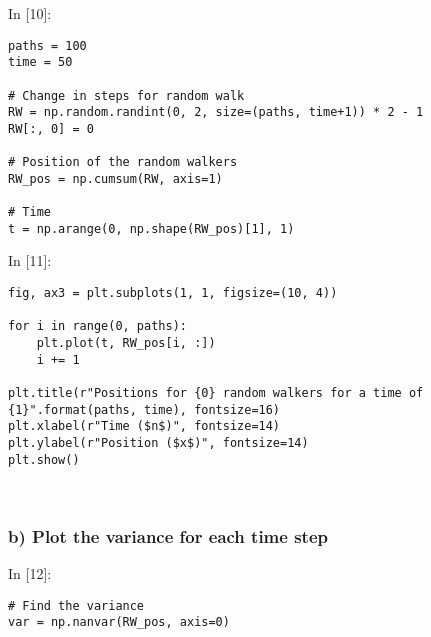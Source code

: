 \documentclass[11pt]{article}
\newif\ifcode
\newif\ifleftmargins
\newlength{\promptlength}
\newcommand{\prompt}[3]{
        \needspace{1.1cm}
        \settowidth{\promptlength}{ #1 [#3] }
        \ifleftmargins\hspace{-\promptlength}\hspace{-5pt}\fi
        {\color{#2}#1 [#3]:}
        \ifleftmargins\vspace{-2.7ex}\fi
    }
\begin{document}
    
\prompt{In}{incolor}{10}
\codetrue
\begin{tcolorbox}[breakable, size=fbox, boxrule=1pt, pad at break*=1mm, colback=cellbackground, colframe=cellborder]
\begin{verbatim}
paths = 100
time = 50

# Change in steps for random walk
RW = np.random.randint(0, 2, size=(paths, time+1)) * 2 - 1
RW[:, 0] = 0

# Position of the random walkers
RW_pos = np.cumsum(RW, axis=1)

# Time
t = np.arange(0, np.shape(RW_pos)[1], 1)
\end{verbatim}
\end{tcolorbox}
\codefalse

    
\prompt{In}{incolor}{11}
\codetrue
\begin{tcolorbox}[breakable, size=fbox, boxrule=1pt, pad at break*=1mm, colback=cellbackground, colframe=cellborder]
\begin{verbatim}
fig, ax3 = plt.subplots(1, 1, figsize=(10, 4))

for i in range(0, paths):
    plt.plot(t, RW_pos[i, :])
    i += 1

plt.title(r"Positions for {0} random walkers for a time of {1}".format(paths, time), fontsize=16)    
plt.xlabel(r"Time ($n$)", fontsize=14)
plt.ylabel(r"Position ($x$)", fontsize=14)
plt.show()
\end{verbatim}
\end{tcolorbox}
\codefalse

    \begin{center}
    \end{center}
    { \hspace*{\fill} \\}
    
    \hypertarget{b-plot-the-variance-for-each-time-step}{%
\subsubsection{b) Plot the variance for each time
step}\label{b-plot-the-variance-for-each-time-step}}

    
\prompt{In}{incolor}{12}
\codetrue
\begin{tcolorbox}[breakable, size=fbox, boxrule=1pt, pad at break*=1mm, colback=cellbackground, colframe=cellborder]
\begin{verbatim}
# Find the variance
var = np.nanvar(RW_pos, axis=0)
\end{verbatim}
\end{tcolorbox}
\codefalse
\end{document}
